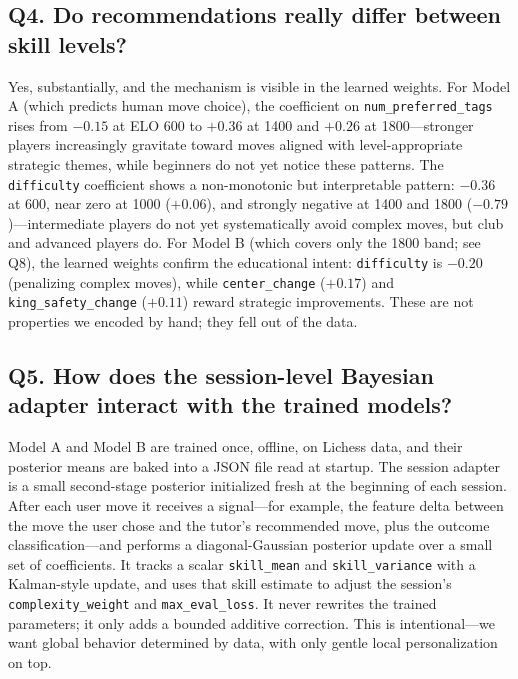 \documentclass[11pt]{article}
\begin{document}
\subsection*{Q4. Do recommendations really differ between skill levels?}
Yes, substantially, and the mechanism is visible in the learned weights. For Model A (which predicts human move choice), the coefficient on \texttt{num\_preferred\_tags} rises from $-0.15$ at ELO 600 to $+0.36$ at 1400 and $+0.26$ at 1800---stronger players increasingly gravitate toward moves aligned with level-appropriate strategic themes, while beginners do not yet notice these patterns. The \texttt{difficulty} coefficient shows a non-monotonic but interpretable pattern: $-0.36$ at 600, near zero at 1000 ($+0.06$), and strongly negative at 1400 and 1800 ($-0.79$)---intermediate players do not yet systematically avoid complex moves, but club and advanced players do. For Model B (which covers only the 1800 band; see Q8), the learned weights confirm the educational intent: \texttt{difficulty} is $-0.20$ (penalizing complex moves), while \texttt{center\_change} ($+0.17$) and \texttt{king\_safety\_change} ($+0.11$) reward strategic improvements. These are not properties we encoded by hand; they fell out of the data.

\subsection*{Q5. How does the session-level Bayesian adapter interact with the trained models?}
Model A and Model B are trained once, offline, on Lichess data, and their posterior means are baked into a JSON file read at startup. The session adapter is a small second-stage posterior initialized fresh at the beginning of each session. After each user move it receives a signal---for example, the feature delta between the move the user chose and the tutor's recommended move, plus the outcome classification---and performs a diagonal-Gaussian posterior update over a small set of coefficients. It tracks a scalar \texttt{skill\_mean} and \texttt{skill\_variance} with a Kalman-style update, and uses that skill estimate to adjust the session's \texttt{complexity\_weight} and \texttt{max\_eval\_loss}. It never rewrites the trained parameters; it only adds a bounded additive correction. This is intentional---we want global behavior determined by data, with only gentle local personalization on top.
\end{document}
